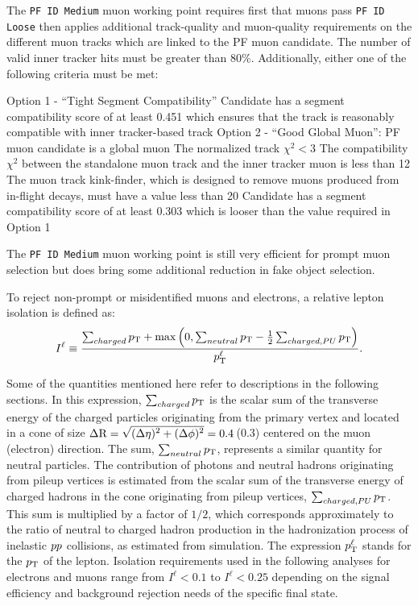 The \texttt{PF ID Medium} muon working point requires first that muons pass \texttt{PF ID Loose} then
applies additional track-quality and muon-quality requirements on the different muon tracks which are
linked to the PF muon candidate. The number of valid inner tracker
hits must be greater than 80\%. Additionally, either one of the following criteria must be met:
\begin{outline}
\1 Option 1 - ``Tight Segment Compatibility''
    \2 Candidate has a segment compatibility score of at least 0.451 which ensures that the 
track is reasonably compatible with inner tracker-based track
\1 Option 2 - ``Good Global Muon'':
    \2 PF muon candidate is a global muon
    \2 The normalized track $\chi^2 < 3$
    \2 The compatibility $\chi^2$ between the standalone muon track and the inner tracker muon is
less than 12
    \2 The muon track kink-finder, which is designed to remove muons produced from in-flight decays, 
must have a value less than 20
    \2 Candidate has a segment compatibility score of at least 0.303 which is looser than the value
required in Option 1
\end{outline}
The \texttt{PF ID Medium} muon working point is still very efficient for prompt muon selection but
does bring some additional reduction in fake object selection.

To reject non-prompt or misidentified muons and electrons, a relative lepton isolation is defined as:
\begin{equation}
I^{\ell} \equiv \frac{\sum_{charged}  p_\mathrm{T} + \max\left( 0, \sum_{neutral}  p_\mathrm{T}
                                         - \frac{1}{2} \sum_{charged, PU} p_\mathrm{T}  \right )}{p_\mathrm{T}^{\ell}}.
\label{eqn:rel_isolation}
\end{equation}

Some of the quantities mentioned here refer to descriptions in the following sections.
In this expression, $\sum_{charged}  p_\mathrm{T}$ is the scalar sum of the transverse energy of the 
charged particles originating from the primary vertex and located in a cone of size
$\Delta \mathrm{R} = \sqrt{\smash[b]{(\Delta \eta)^2 + (\Delta \phi)^2}} = 0.4$\,(0.3)
centered on the muon (electron) direction. The sum, $\sum_{neutral}  p_\mathrm{T}$, represents
a similar quantity for neutral particles. The contribution of photons and neutral hadrons 
originating from pileup vertices is estimated from the scalar sum of the transverse
energy of charged hadrons in the cone originating from pileup vertices,
$\sum_{charged, PU} p_\mathrm{T}$. This sum is multiplied by a factor of $1/2$, which corresponds 
approximately to the ratio of neutral to charged hadron production in the hadronization process
of inelastic $pp$ collisions, as estimated from simulation. The expression $p_\mathrm{T}^{\ell}$ 
stands for the $p_\mathrm{T}$ of the lepton. Isolation requirements used in the following analyses
for electrons and muons range from $I^{\ell} < 0.1$ to $I^{\ell} < 0.25$ depending on the signal efficiency and
background rejection needs of the specific final state. 


